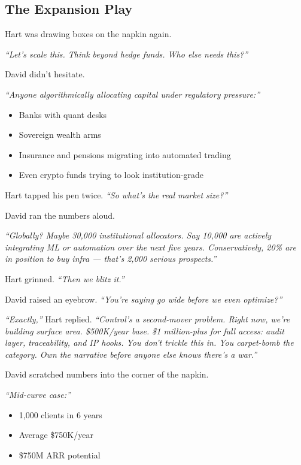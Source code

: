 \medskip


\subsection{The Expansion Play}

Hart was drawing boxes on the napkin again.

\textit{``Let’s scale this. Think beyond hedge funds. Who else needs this?''}

David didn’t hesitate.

\textit{``Anyone algorithmically allocating capital under regulatory pressure:''}

\begin{itemize}
  \item Banks with quant desks  
  \item Sovereign wealth arms  
  \item Insurance and pensions migrating into automated trading  
  \item Even crypto funds trying to look institution-grade
\end{itemize}

Hart tapped his pen twice. \textit{``So what’s the real market size?''}

David ran the numbers aloud.

\textit{``Globally? Maybe 30{,}000 institutional allocators.  
Say 10{,}000 are actively integrating ML or automation over the next five years.  
Conservatively, 20\% are in position to buy infra — that’s 2{,}000 serious prospects.''}

Hart grinned. \textit{``Then we blitz it.''}

David raised an eyebrow. \textit{``You’re saying go wide before we even optimize?''}

\textit{``Exactly,''} Hart replied. \textit{``Control’s a second-mover problem.  
Right now, we’re building surface area. \$500K/year base. \$1 million-plus for full access: audit layer, 
traceability, and IP hooks.  
You don’t trickle this in. You carpet-bomb the category. Own the narrative before anyone else knows 
there’s a war.''}

David scratched numbers into the corner of the napkin.

\textit{``Mid-curve case:''}

\begin{itemize}
  \item 1{,}000 clients in 6 years  
  \item Average \$750K/year  
  \item \$750M ARR potential
\end{itemize}


